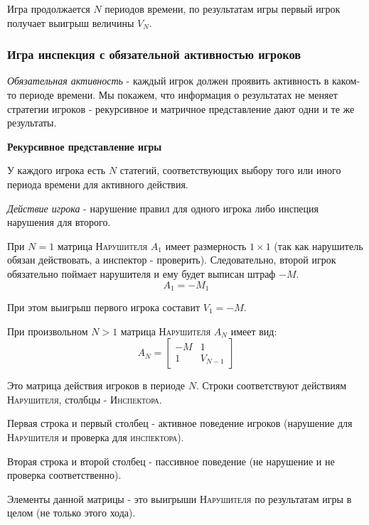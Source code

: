 \documentclass[aps,%
12pt,%
final,%
oneside,
onecolumn,%
musixtex, %
superscriptaddress,%
centertags]{article} %
\theoremstyle{plain}
\theoremstyle{definition}
\theoremstyle{remark}
\begin{document}
Игра продолжается $N$ периодов времени, по результатам игры первый игрок получает выигрыш величины $V_N$.

\subsubsection{Игра инспекция с обязательной активностью игроков}

\textit{Обязательная активность} - каждый игрок должен проявить активность в каком-то периоде времени. Мы покажем, что информация о результатах не меняет стратегии игроков - рекурсивное и матричное представление дают одни и те же результаты.

\textbf{Рекурсивное представление игры}

У каждого игрока есть $N$ статегий, соответствующих выбору того или иного периода времени для активного действия.

\textit{Действие игрока} - нарушение правил для одного игрока либо инспеция нарушения для второго.

При $N=1$ матрица \textsc{Нарушителя} $A_1$ имеет размерность $1 \times 1$ (так как нарушитель обязан действовать, а инспектор - проверить). Следовательно, второй игрок обязательно поймает нарушителя и ему будет выписан штраф $-M$.
$$A_1 = - M_1$$

При этом выигрыш первого игрока составит $V_1 = -M$.

При произвольном $N>1$ матрица \textsc{Нарушителя} $A_N$ имеет вид:
$$A_N = \begin{bmatrix}
  -M & 1 \\ 1 & V_{N-1}
\end{bmatrix}$$

Это матрица действия игроков в периоде $N$. Строки соответствуют действиям \textsc{Нарушителя}, столбцы - \textsc{Инспектора}. 

Первая строка и первый столбец - активное поведение игроков (нарушение для \textsc{Нарушителя} и проверка для \textsc{инспектора}).

Вторая строка и второй столбец - пассивное поведение (не нарушение и не проверка соответственно).

Элементы данной матрицы  - это выигрыши \textsc{Нарушителя} по результатам игры в целом (не только этого хода).
\end{document}
